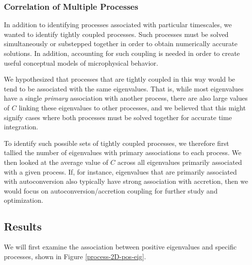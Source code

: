 \documentclass [11pt, proquest] {uwthesis}[2020/02/24]
\begin{document}
\subsubsection{Correlation of Multiple Processes}

In addition to identifying processes associated with particular timescales, we wanted to identify tightly coupled processes. Such processes must be solved simultaneously or substepped together in order to obtain numerically accurate solutions. In addition, accounting for such coupling is needed in order to create useful conceptual models of microphysical behavior.

We hypothesized that processes that are tightly coupled in this way would be tend to be associated with the same eigenvalues. That is, while most eigenvalues have a single \emph{primary} association with another process, there are also large values of $C$ linking these eigenvalues to other processes, and we believed that this might signify cases where both processes must be solved together for accurate time integration.

To identify such possible sets of tightly coupled processes, we therefore first tallied the number of eigenvalues with primary associations to each process. We then looked at the average value of $C$ across all eigenvalues primarily associated with a given process. If, for instance, eigenvalues that are primarily associated with autoconversion also typically have strong association with accretion, then we would focus on autoconversion/accretion coupling for further study and optimization.

\subsection{Results}
\label{sec:proc-assoc-results}

We will first examine the association between positive eigenvalues and specific processes, shown in Figure \ref{process-2D-pos-eig}.
\end{document}
